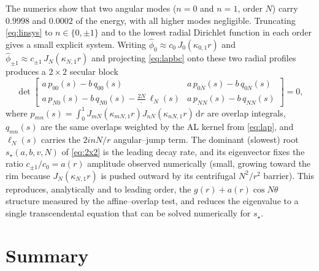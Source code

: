 \documentclass{article}
\newcommand{\rd}{\mathrm{d}}
\begin{document}
The numerics show that two angular modes ($n=0$ and $n=1$, order $N$) carry
$0.9998$ and $0.0002$ of the energy, with all higher modes negligible. Truncating
\eqref{eq:linsys} to $n\in\{0,\pm1\}$ and to the lowest radial Dirichlet
function in each order gives a small explicit system. Writing
$\widehat\phi_0\approx c_0\,J_0(\kappa_{0,1}r)$ and
$\widehat\phi_{\pm1}\approx c_{\pm1}\,J_N(\kappa_{N,1}r)$ and projecting
\eqref{eq:lapbc} onto these two radial profiles produces a $2\times2$ secular
block
\begin{equation}
\det
\begin{bmatrix}
a\,p_{00}(s)-b\,q_{00}(s) & a\,p_{0N}(s)-b\,q_{0N}(s)\\[4pt]
a\,p_{N0}(s)-b\,q_{N0}(s)-\tfrac{2N}{\,\cdot\,}\,\ell_{N}(s)
& a\,p_{NN}(s)-b\,q_{NN}(s)
\end{bmatrix}=0,
\label{eq:2x2}
\end{equation}
where $p_{mn}(s)=\int_0^1 J_{mN}(\kappa_{mN,1}r)J_{nN}(\kappa_{nN,1}r)\,\rd r$
are overlap integrals, $q_{mn}(s)$ are the same overlaps weighted by the AL
kernel from \eqref{eq:lap}, and $\ell_N(s)$ carries the $2inN/r$ angular--jump
term. The dominant (slowest) root $s_\star(a,b,v,N)$ of \eqref{eq:2x2} is the
leading decay rate, and its eigenvector fixes the ratio $c_{\pm1}/c_0=a(r)$
amplitude observed numerically (small, growing toward the rim because
$J_N(\kappa_{N,1}r)$ is pushed outward by its centrifugal $N^2/r^2$ barrier).
This reproduces, analytically and to leading order, the $g(r)+a(r)\cos N\theta$
structure measured by the affine--overlap test, and reduces the eigenvalue to a
single transcendental equation that can be solved numerically for $s_\star$.

\section{Summary}
\end{document}

